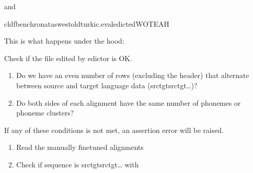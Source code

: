 \documentclass[letterpaper,10pt,english]{sphinxmanual}
\begin{document}
{{{{\sphinxAtStartPar
and

\begin{sphinxVerbatim}[commandchars=\\\{\}]
cldfbenchronataswestoldturkic.evaledictedWOTEAH
\end{sphinxVerbatim}

\sphinxAtStartPar
This is what happens under the hood:

\label{\detokenize{mkedictor:module-ronataswestoldturkiccommands.evaledicted}}
\sphinxAtStartPar
Check if the file edited by edictor is OK.
\begin{enumerate}
%
\item {} 
\sphinxAtStartPar
Do we have an even number of rows (excluding the header) that alternate between source and target language data (src\sphinxhyphen{}tgt\sphinxhyphen{}src\sphinxhyphen{}tgt\sphinxhyphen{}…)?

\item {} 
\sphinxAtStartPar
Do both sides of each alignment have the same number of phonemes or phoneme clusters?

\end{enumerate}

\sphinxAtStartPar
If any of these conditions is not met, an assertion error will be raised.

\begin{fulllineitems}
\label{\detokenize{mkedictor:ronataswestoldturkiccommands.evaledicted.run}}
\pysigstartsignatures
{}
\pysigstopsignatures\begin{enumerate}
%
\item {} 
\sphinxAtStartPar
Read the manually fine\sphinxhyphen{}tuned alignments

\item {} 
\sphinxAtStartPar
Check if sequence is src\sphinxhyphen{}tgt\sphinxhyphen{}src\sphinxhyphen{}tgt\sphinxhyphen{}…
with 


\end{enumerate}
\end{fulllineitems}}}}}
\end{document}
